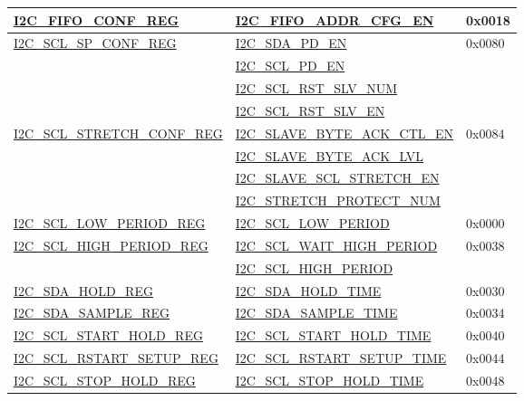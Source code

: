 \documentclass[main\_\_EN.tex]{subfiles}
\begin{document}
\begin{longtable}{ | p{6cm} | p{7cm} | p{2cm} | }
\hyperref[regdesc:I2CFIFOCONFREG]{I2C\_FIFO\_CONF\_REG} & {\hyperref[fielddesc:I2CFIFOADDRCFGEN]{I2C\_FIFO\_ADDR\_CFG\_EN}} & 0x0018 \\ \hline
\hyperref[regdesc:I2CSCLSPCONFREG]{I2C\_SCL\_SP\_CONF\_REG} & {\hyperref[fielddesc:I2CSDAPDEN]{I2C\_SDA\_PD\_EN}} & 0x0080  \\\cline{2-2}
& {\hyperref[fielddesc:I2CSCLPDEN]{I2C\_SCL\_PD\_EN}}& \\\cline{2-2}
& {\hyperref[fielddesc:I2CSCLRSTSLVNUM]{I2C\_SCL\_RST\_SLV\_NUM}}& \\\cline{2-2}
& {\hyperref[fielddesc:I2CSCLRSTSLVEN]{I2C\_SCL\_RST\_SLV\_EN}}& \\ \hline
\hyperref[regdesc:I2CSCLSTRETCHCONFREG]{I2C\_SCL\_STRETCH\_CONF\_REG} & {\hyperref[fielddesc:I2CSLAVEBYTEACKCTLEN]{I2C\_SLAVE\_BYTE\_ACK\_CTL\_EN}} & 0x0084  \\\cline{2-2}
& {\hyperref[fielddesc:I2CSLAVEBYTEACKLVL]{I2C\_SLAVE\_BYTE\_ACK\_LVL}}& \\\cline{2-2}
& {\hyperref[fielddesc:I2CSLAVESCLSTRETCHEN]{I2C\_SLAVE\_SCL\_STRETCH\_EN}}& \\\cline{2-2}
& {\hyperref[fielddesc:I2CSTRETCHPROTECTNUM]{I2C\_STRETCH\_PROTECT\_NUM}}& \\ \hline
\hyperref[regdesc:I2CSCLLOWPERIODREG]{I2C\_SCL\_LOW\_PERIOD\_REG} & \hyperref[fielddesc:I2CSCLLOWPERIOD]{I2C\_SCL\_LOW\_PERIOD} & 0x0000  \\ \hline
\hyperref[regdesc:I2CSCLHIGHPERIODREG]{I2C\_SCL\_HIGH\_PERIOD\_REG} & \hyperref[fielddesc:I2CSCLWAITHIGHPERIOD]{I2C\_SCL\_WAIT\_HIGH\_PERIOD} & 0x0038  \\\cline{2-2}
& \hyperref[fielddesc:I2CSCLHIGHPERIOD]{I2C\_SCL\_HIGH\_PERIOD}& \\ \hline
\hyperref[regdesc:I2CSDAHOLDREG]{I2C\_SDA\_HOLD\_REG} & \hyperref[fielddesc:I2CSDAHOLDTIME]{I2C\_SDA\_HOLD\_TIME} & 0x0030  \\\hline
\hyperref[regdesc:I2CSDASAMPLEREG]{I2C\_SDA\_SAMPLE\_REG} & \hyperref[fielddesc:I2CSDASAMPLETIME]{I2C\_SDA\_SAMPLE\_TIME} & 0x0034  \\ \hline
\hyperref[regdesc:I2CSCLSTARTHOLDREG]{I2C\_SCL\_START\_HOLD\_REG} & \hyperref[fielddesc:I2CSCLSTARTHOLDTIME]{I2C\_SCL\_START\_HOLD\_TIME} & 0x0040  \\ \hline
\hyperref[regdesc:I2CSCLRSTARTSETUPREG]{I2C\_SCL\_RSTART\_SETUP\_REG} & \hyperref[fielddesc:I2CSCLRSTARTSETUPTIME]{I2C\_SCL\_RSTART\_SETUP\_TIME} & 0x0044  \\ \hline
\hyperref[regdesc:I2CSCLSTOPHOLDREG]{I2C\_SCL\_STOP\_HOLD\_REG} & \hyperref[fielddesc:I2CSCLSTOPHOLDTIME]{I2C\_SCL\_STOP\_HOLD\_TIME} & 0x0048  \\ \hline

\end{longtable}
\end{document}
